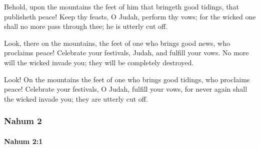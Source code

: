 			\begin{versebox}
					\item[BHS] 
					\item[LXX] 
					\item[ASV] Behold, upon the mountains the feet of him that bringeth good tidings, that publisheth peace! Keep thy feasts, O Judah, perform thy vows; for the wicked one shall no more pass through thee; he is utterly cut off.
					\item[NIV] Look, there on the mountains, the feet of one who brings good news, who proclaims peace! Celebrate your festivals, Judah, and fulfill your vows. No more will the wicked invade you; they will be completely destroyed.
					\item[NRSV] Look! On the mountains the feet of one who brings good tidings, who proclaims peace! Celebrate your festivals, O Judah, fulfill your vows, for never again shall the wicked invade you; they are utterly cut off.
			\end{versebox}
	\subsubsection{Nahum 2} %
		\label{NAHUM-2}

		\paragraph{Nahum 2:1} %
			\label{NAHUM-2-1}

